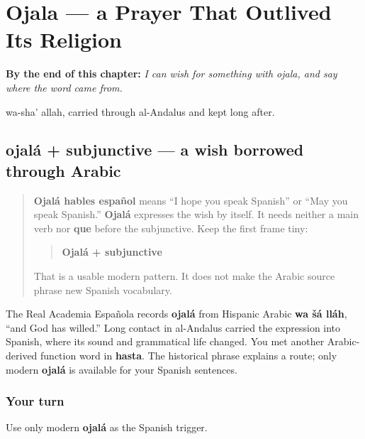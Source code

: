 
\chapter{Ojala --- a Prayer That Outlived Its Religion}
\label{ch:spanish-ojala}

\begin{chapteropening}
\textbf{By the end of this chapter:} \emph{I can wish for something with ojala, and say where the word came from.}

wa-sha' allah, carried through al-Andalus and kept long after.
\end{chapteropening}

\section[ojalá + subjunctive]{ojalá + subjunctive — a wish borrowed through Arabic}

\label{lesson:ES-C18-ojala}



\begin{quote}
\textbf{Ojalá hables español} means “I hope you speak Spanish” or “May you speak Spanish.” \textbf{Ojalá} expresses the wish by itself. It needs neither a main verb nor \textbf{que} before the subjunctive. Keep the first frame tiny:

\begin{quote}
\textbf{Ojalá + subjunctive}
\end{quote}

That is a usable modern pattern. It does not make the Arabic source phrase new Spanish vocabulary.
\end{quote}

\begin{cousinweb}
The Real Academia Española records \textbf{ojalá} from Hispanic Arabic \textbf{wa šá lláh}, “and God has willed.” Long contact in al-Andalus carried the expression into Spanish, where its sound and grammatical life changed. You met another Arabic-derived function word in \textbf{hasta}. The historical phrase explains a route; only modern \textbf{ojalá} is available for your Spanish sentences.
\end{cousinweb}

\subsection*{Your turn}
Use only modern \textbf{ojalá} as the Spanish trigger.

